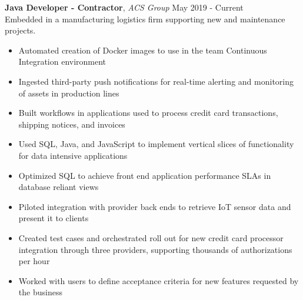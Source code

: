 \documentclass[9pt]{article}
\newenvironment{changemargin}[2]{%
  \begin{list}{}{%
      \setlength{\topsep}{0pt}%
      \setlength{\leftmargin}{#1}%
      \setlength{\rightmargin}{#2}%
      \setlength{\listparindent}{\parindent}%
      \setlength{\itemindent}{\parindent}%
      \setlength{\parsep}{\parskip}%
    }%
  \item[]}{\end{list}
}
\newenvironment{body} {
  \vspace*{-16pt}
  \begin{changemargin}{-0.25in}{-0.5in}
  }	
  {\end{changemargin}
}
\begin{document}
\begin{body}
  \vspace{17pt}
  \textbf{Java Developer - Contractor}, \emph{ACS Group} \hfill May 2019 - Current \\
  \vspace*{3pt}
  Embedded in a manufacturing logistics firm supporting new and maintenance projects.
  \begin{itemize} \itemsep -0pt
  \item Automated creation of Docker images to use in the team Continuous Integration environment
  \item Ingested third-party push notifications for real-time alerting and monitoring of assets in production lines
  \item Built workflows in applications used to process credit card transactions, shipping notices, and invoices
  \item Used SQL, Java, and JavaScript to implement vertical slices of functionality for data intensive applications
  \item Optimized SQL to achieve front end application performance SLAs in database reliant views
  \item Piloted integration with provider back ends to retrieve IoT sensor data and present it to clients
  \item Created test cases and orchestrated roll out for new credit card processor integration through three providers, supporting thousands of authorizations per hour
  \item Worked with users to define acceptance criteria for new features requested by the business
  \end{itemize}
  \vspace{17pt}
  


\end{body}
\end{document}
